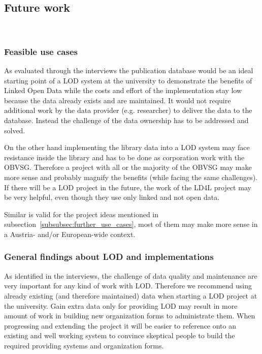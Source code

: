 \subsection{Future work}~\label{subsection:future_work}

\subsubsection{Feasible use cases}

As evaluated through the interviews the publication database would be an ideal starting point of a LOD system at the university to demonstrate the benefits of Linked Open Data while the costs and effort of the implementation stay low because the data already exists and are maintained. It would not require additional work by the data provider (e.g. researcher) to deliver the data to the database. Instead the challenge of the data ownership has to be addressed and solved.

On the other hand implementing the library data into a LOD system may face resistance inside the library and has to be done as corporation work with the OBVSG. Therefore a project with all or the majority of the OBVSG may make more sense and probably magnify the benefits (while facing the same challenges). If there will be a LOD project in the future, the work of the LD4L project may be very helpful, even though they use only linked and not open data.

Similar is valid for the project ideas mentioned in subsection~\ref{subsubsec:further_use_cases}, most of them may make more sense in a Austria- and/or European-wide context.

\subsubsection{General findings about LOD and implementations}

As identified in the interviews, the challenge of data quality and maintenance are very important for any kind of work with LOD. Therefore we recommend using already existing (and therefore maintained) data when starting a LOD project at the university. Gain extra data only for providing LOD may result in more amount of work in building new organization forms to administrate them. When progressing and extending the project it will be easier to reference onto an existing and well working system to convince skeptical people to build the required providing systems and organization forms.

